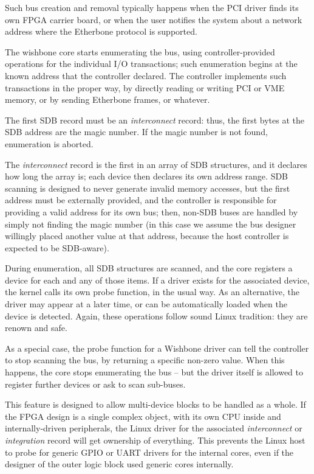 \documentclass[a4paper, 12pt]{article}
\begin{document}
Such bus creation and removal typically happens when the PCI
driver finds its own FPGA carrier board, or when the user notifies the system
about a network address where the Etherbone protocol is supported.

The wishbone core starts enumerating the bus, using
controller-provided operations for the individual I/O transactions;
such enumeration begins at the known address that the controller declared.
The controller implements such transactions in the proper way, by
directly reading or writing PCI or VME memory, or by sending Etherbone frames,
or whatever.

The first SDB record must be an \textit{interconnect} record: thus,
the first bytes at the SDB address are the magic number. If the magic number is not found,
enumeration is aborted.

The \textit{interconnect} record is the first
in an array of SDB structures, and it declares how long the array is;
each device then declares its own address range.  SDB scanning is
designed to never generate invalid memory accesses, but the first
address must be externally provided, and the controller is responsible
for providing a valid address for its own bus; then, non-SDB buses are
handled by simply not finding the magic number (in this case we assume
the bus designer willingly placed another value at that address, because
the host controller is expected to be SDB-aware).

During enumeration, all SDB structures are scanned, and the core
registers a device for each and any of those items.  If a driver exists
for the associated device, the kernel calls its own probe function, in the
usual way.  As an alternative, the driver may appear at a later time,
or can be automatically loaded when the device is detected. Again, these
operations follow sound Linux tradition: they are renown and safe.

As a special case, the probe function for a Wishbone driver can tell
the controller to stop scanning the bus, by
returning a specific non-zero value.  When this happens, the core stops
enumerating the bus -- but the driver itself is allowed to register
further devices or ask to scan sub-buses.

This feature is designed to allow multi-device blocks to be handled as
a whole.  If the FPGA design is a single complex object, with its own
CPU inside and internally-driven peripherals, the Linux driver for the
associated \textit{interconnect} or \textit{integration} record will
get ownership of everything.  This prevents the Linux host to
probe for generic GPIO or UART drivers for the internal cores, even
if the designer of the outer logic block used generic cores internally.
\end{document}
